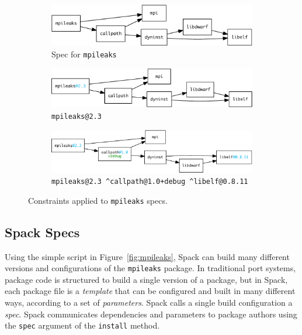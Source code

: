 
\begin{figure}
	\begin{subfigure}{\linewidth}
		\centering
		\includegraphics[width=.9\columnwidth]{specs/mpileaks.pdf}
		\caption{
			Spec for {\tt mpileaks}
			\label{fig:specs-mpileaks}
		}
	\end{subfigure}
%
	\begin{subfigure}{\linewidth}
		\centering
		\includegraphics[width=.9\columnwidth]{specs/mpileaks-version}
		\caption{
			{\tt mpileaks@2.3}
			\label{fig:specs-mpileaks-version}
		}
	\end{subfigure}
%
	\begin{subfigure}{\linewidth}
		\centering
		\includegraphics[width=.9\columnwidth]{specs/mpileaks-abstract.pdf}
		\caption{
			{\tt mpileaks@2.3 \^{}callpath@1.0+debug \^{}libelf@0.8.11}
			\label{fig:specs-mpileaks-abstract}
		}
	\end{subfigure}
%
	\caption{
		Constraints applied to {\tt mpileaks} specs.
	}
	\label{fig:specs}
\end{figure}



\subsection{Spack Specs}\label{sec:specs}

Using the simple script in Figure~\ref{fig:mpileaks}, Spack can build many different
versions and configurations of the {\tt mpileaks} package.  In traditional port systems,
package code is structured to build a single version of a package, but in Spack, each
package file is a {\it template} that can be configured and built in many
different ways, according to a set of {\it parameters}.
Spack calls a single build configuration a {\it spec}.
Spack communicates dependencies and parameters to package authors using
the {\tt spec} argument of the {\tt install} method.

